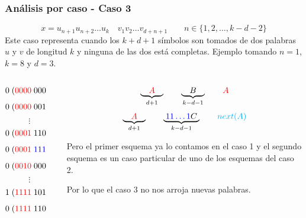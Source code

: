 \documentclass[10pt,mathserif]{beamer}%
\begin{document}
\begin{frame}
  \frametitle{Análisis por caso - Caso 3}
  $$x = u_{n+1} u_{n+2} \dots u_k \quad  v_1 v_2 \dots v_{d+n+1}   \qquad n \in \{1,2,\dots ,k - d - 2\}  $$
  Este caso representa cuando los $k + d + 1$ símbolos son tomados de dos palabras $u$ y $v$ de longitud $k$ y ninguna de las dos está completas.
  Ejemplo tomando $n = 1$, $k = 8$ y $d = 3$.
  \begin{columns}
    \begin{column}{0.5\textwidth}
      \begin{small}

      $$0\; (\textcolor{red}{0000}\; 000 \qquad 0 \;\textcolor{red}{0000} ) \;001$$
      $$0\; (\textcolor{red}{0000} \;001 \qquad 0 \;\textcolor{red}{0000} ) \;010$$
      $$\vdots$$
      $$0\; (\textcolor{red}{0001} \;110 \qquad 0 \;\textcolor{red}{0001} ) \;111$$
      $$0\; (\textcolor{red}{0001} \;\textcolor{blue}{111} \qquad 0 \;\textcolor{cyan}{0010} ) \;000$$
      $$0\; (\textcolor{red}{0010} \;000 \qquad 0 \;\textcolor{red}{0010} ) \;001$$
      $$\vdots$$
      $$1\; (\textcolor{red}{1111} \;101 \qquad 1 \;\textcolor{red}{1111} ) \;110$$
      $$0\; (\textcolor{red}{1111} \;110 \qquad 1 \;\textcolor{red}{1111} ) \;111$$
      \end{small}
    \end{column}
    \begin{column}{0.5\textwidth}  %
      \pause
      $$\underbrace{\quad \textcolor{red}{A} \quad }_{d +1} \qquad \underbrace{\quad B \quad }_{k - d - 1}  \qquad \textcolor{red}{A}$$
      $$\underbrace{\quad \textcolor{red}{A} \quad }_{d +1} \qquad \underbrace{\; \textcolor{blue}{11\dots1}C \; }_{k - d - 1}  \qquad \textcolor{cyan}{next(A)}$$

      Pero el primer esquema ya lo contamos en el caso 1 y el segundo esquema es un caso particular de uno de los esquemas del caso 2.
      
      Por lo que el caso 3 no nos arroja nuevas palabras.
    \end{column}
    \end{columns}
\end{frame}
\end{document}
